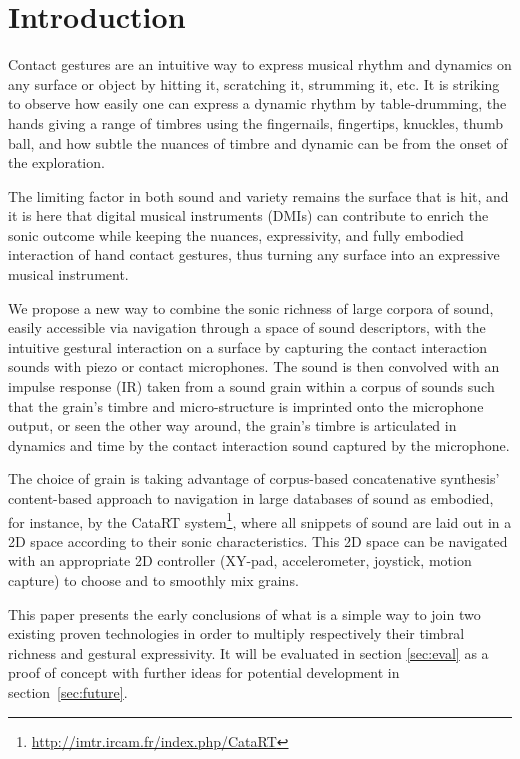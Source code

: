\section{Introduction}


Contact gestures are an intuitive way to express musical rhythm and dynamics on any surface or object by hitting it, scratching it, strumming it, etc.  It is striking to observe how easily one can express a dynamic rhythm by table-drumming, the hands giving a range of timbres using the fingernails, fingertips, knuckles, thumb ball, and how subtle the nuances of timbre and dynamic can be from the onset of the exploration.

The limiting factor in both sound and variety remains the surface that is hit, and it is here that digital musical instruments (DMIs) can contribute to enrich the sonic outcome while keeping the nuances, expressivity, and fully embodied interaction of hand contact gestures, thus turning any surface into an expressive musical instrument.

We propose a new way to combine the sonic richness of large corpora of sound, easily accessible via navigation through a space of sound descriptors, with the intuitive gestural interaction on a surface by capturing the contact interaction sounds with piezo or contact microphones. The sound is then convolved with an impulse response (IR) taken from a sound grain within a corpus of sounds such that the grain's timbre and micro-structure is imprinted onto the microphone output, or seen the other way around, the grain's timbre is articulated in dynamics and time by the contact interaction sound captured by the microphone. 

The choice of grain is taking advantage of corpus-based concatenative synthesis' content-based approach to navigation in large databases of sound as embodied, for instance, by the CataRT system\footnote{\url{http://imtr.ircam.fr/index.php/CataRT}}, where all snippets of sound are laid out in a 2D space according to their sonic characteristics.  This 2D space can be navigated with an appropriate 2D controller (XY-pad, accelerometer, joystick, motion capture) to choose and to smoothly mix grains.

This paper presents the early conclusions of what is a simple way to join two existing proven technologies in order to multiply respectively their timbral richness and gestural expressivity. It will be evaluated in section \ref{sec:eval} as a proof of concept with further ideas for potential development in section~\ref{sec:future}.



